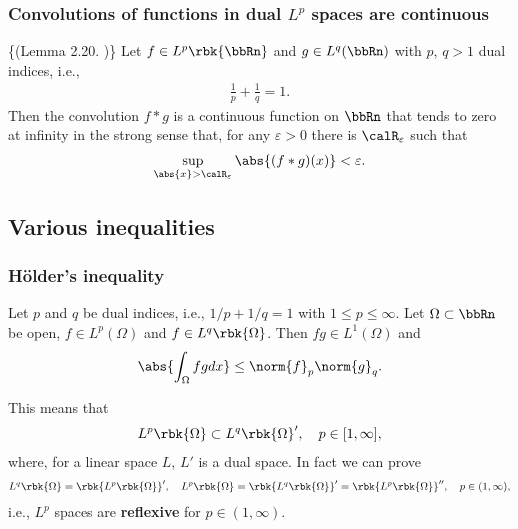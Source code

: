 \documentclass[openany, a4paper, oneside]{jsbook}
\begin{document}
\subsubsection{Convolutions of functions in dual $L^p$ spaces are continuous}

\begin{lem}\textup\{(Lemma 2.20. \cite{LiebLoss1})\}\label{Lieb-Loss_Analysis_chap11_41}
 Let $f \in L^p \rbk{\bbRn}$ and $g \in L^q (\bbRn)$ with $p$, $q > 1$ dual indices, i.e.,
\begin{align}
 \frac{1}{p} + \frac{1}{q} = 1.
\end{align}
Then the convolution $f*g$ is a continuous function on $\bbRn$ that tends to zero at infinity in the strong sense that,
for any $\varepsilon > 0$ there is $\calR_{\varepsilon}$ such that
\begin{align}
 \sup_{\abs{x} > \calR_{\varepsilon}} \abs{(f*g) (x)} < \varepsilon.
\end{align}
\end{lem}
\subsection{Various inequalities}

\subsubsection{H\"older's inequality}

\begin{thm}
 Let $p$ and $q$ be dual indices, i.e., $1/p + 1/q = 1$ with $1 \leq p \leq \infty$.
 Let $\Omega \subset \bbRn$ be open, $f \in L^p (\Omega)$ and $f \in L^q \rbk{\Omega}$.
 Then $fg \in L^1 (\Omega)$ and
 \begin{align}
  \abs{\int_{\Omega} fg dx}
  \leq
  \norm{f}_p \norm{g}_q.
 \end{align}
\end{thm}
This means that
\begin{align}
 L^p \rbk{\Omega} \subset L^q \rbk{\Omega}', \quad p \in [1, \infty],
\end{align}
where, for a linear space $L$, $L'$ is a dual space.
In fact we can prove
\begin{align}
 L^q \rbk{\Omega} = \rbk{L^p \rbk{\Omega}}', \quad
 L^p \rbk{\Omega} = \rbk{L^q \rbk{\Omega}}' = \rbk{L^p \rbk{\Omega}}'', \quad
 p \in (1, \infty),
\end{align}
i.e., $L^p$ spaces are \textbf{reflexive} for $p \in (1, \infty)$.
\end{document}
